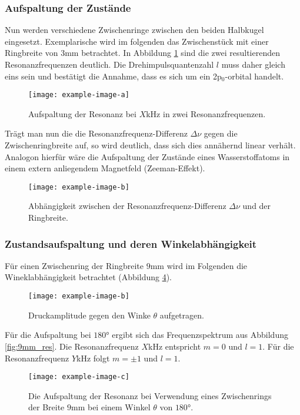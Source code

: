 \subsubsection*{Aufspaltung der Zustände}
Nun werden verschiedene Zwischenringe zwischen den beiden Halbkugel eingesetzt. Exemplarische wird im folgenden das Zwischenstück
mit einer Ringbreite von $3$mm betrachtet. In Abbildung \ref{fig:aufspaltung} sind die zwei resultierenden Resonanzfrequenzen
deutlich. Die Drehimpulsquantenzahl $l$ muss daher gleich eins sein und bestätigt die Annahme, dass es sich um ein 2p$_0$-orbital handelt.  

\begin{figure}[H]
    \center
    \texttt{[image: example-image-a]}
    \caption{Aufspaltung der Resonanz bei $X$kHz in zwei Resonanzfrequenzen.}
    \label{fig:aufspaltung}
\end{figure}

Trägt man nun die die Resonanzfrequenz-Differenz $\Delta\nu$ gegen die Zwischenringbreite auf,
so wird deutlich, dass sich dies annähernd linear verhält. Analogon hierfür wäre die Aufspaltung der Zustände eines
Wasserstoffatoms in einem extern anliegendem Magnetfeld (Zeeman-Effekt).

\begin{figure}[H]
    \center
    \texttt{[image: example-image-b]}
    \caption{Abhängigkeit zwischen der Resonanzfrequenz-Differenz $\Delta\nu$ und der Ringbreite.}
    \label{fig:d_res}
\end{figure}

\subsubsection*{Zustandsaufspaltung und deren Winkelabhängigkeit}
Für einen Zwischenring der Ringbreite $9$mm wird im Folgenden die Wineklabhängigkeit betrachtet (Abbildung \ref{fig:9mm_winkel}).

\begin{figure}[H]
    \center
    \texttt{[image: example-image-b]}
    \caption{Druckamplitude gegen den Winke $\theta$ aufgetragen.}
    \label{fig:9mm_winkel}
\end{figure}

Für die Aufspaltung bei $180°$ ergibt sich das Frequenzspektrum aus Abbildung \ref{fig:9mm_res}.
Die Resonanzfrequenz $X$kHz entspricht $m=0$ und $l=1$. Für die Resonanzfrequenz $Y$kHz folgt $m=\pm 1$ und $l=1$.
\begin{figure}[H]
    \center
    \texttt{[image: example-image-c]}
    \caption{Die Aufspaltung der Resonanz bei Verwendung eines Zwischenrings der Breite $9$mm bei einem Winkel $\theta$ von $180°$.}
    \label{fig:9mm_winkel}
\end{figure}
\newpage
